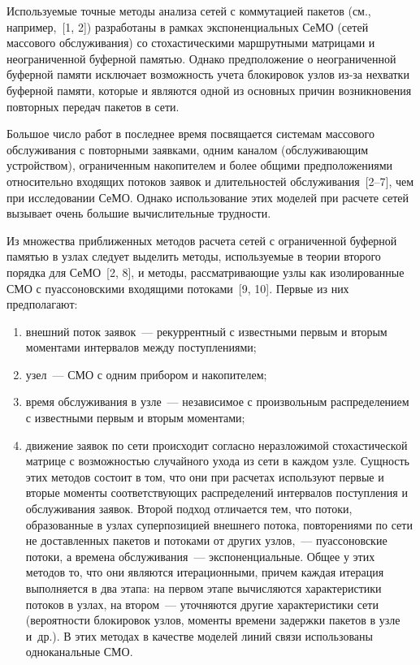 \begin{multicols}{2}
     Используемые точные методы анализа сетей с коммутацией пакетов (см., 
например,~[1, 2]) разработаны в рамках экспоненциальных СеМО (сетей 
массового обслуживания) со стохастическими маршрутными матрицами и 
неограниченной буферной памятью. Однако предположение о неограниченной 
буферной памяти исключает возможность учета блокировок узлов из-за 
нехватки буферной памяти, которые и являются одной из основных причин 
возникновения повторных передач пакетов в сети.
     
     Большое число работ в последнее время посвящается системам массового 
обслуживания с повторными заявками, одним каналом (обслуживающим 
устройством), ограниченным накопителем и более общими предположениями 
относительно входящих потоков заявок и длительностей обслуживания~[2--7], 
чем при исследовании СеМО. Однако использование этих моделей при расчете 
сетей вызывает очень большие вычислительные трудности.
     
     Из множества приближенных методов расчета сетей с ограниченной 
буферной памятью в узлах следует выделить методы, используемые в теории 
второго порядка для СеМО~[2, 8], и методы, рассматривающие узлы как 
изолированные СМО с пуассоновскими входящими потоками~[9, 10]. Первые 
из них предполагают: 
     \begin{enumerate}[1)]
     \item внешний поток заявок~--- рекуррентный с известными первым и 
вторым моментами интервалов между поступлениями; 
     \item  узел~--- СМО с одним прибором и накопителем;
     \item  время обслуживания в узле~--- независимое с произвольным 
распределением с известными первым и вторым моментами;
     \item движение заявок по сети происходит согласно неразложимой 
стохастической матрице с возможностью случайного ухода из сети в каждом 
узле. Сущность этих методов состоит в том, что они при расчетах используют 
первые и вторые моменты соответствующих распределений интервалов 
поступления и обслуживания заявок. Второй подход отличается тем, что 
потоки, образованные в узлах суперпозицией внешнего потока, повторениями 
по сети не доставленных пакетов и потоками от других узлов,~--- 
пуассоновские потоки, а времена обслуживания~--- экспоненциальные. Общее 
у этих методов то, что они являются итерационными, причем каждая итерация 
выполняется в два этапа: на первом этапе вычисляются характеристики потоков 
в узлах, на втором~--- уточняются другие характеристики сети (вероятности 
блокировок узлов, моменты времени задержки пакетов в узле и~др.). В этих 
методах в качестве моделей линий связи использованы одноканальные СМО. 
     \end{enumerate}
     

\end{multicols}
